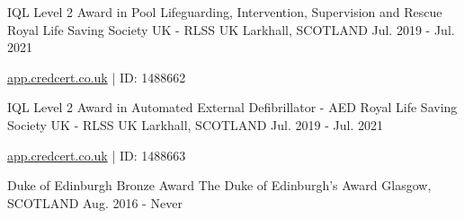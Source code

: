 

\begin{cventries}

  \cventry
    {IQL Level 2 Award in Pool Lifeguarding, Intervention, Supervision and Rescue} %
    {Royal Life Saving Society UK - RLSS UK} %
    {Larkhall, SCOTLAND} %
    {Jul. 2019 - Jul. 2021} %
    {
      \begin{cvitems} %
        \item \href{https://app.credcert.co.uk/3p/rlss/}{app.credcert.co.uk} | ID: 1488662
      \end{cvitems}
    }
    \vspace{.08cm}
    
  \cventry
    {IQL Level 2 Award in Automated External Defibrillator - AED} %
    {Royal Life Saving Society UK - RLSS UK} %
    {Larkhall, SCOTLAND} %
    {Jul. 2019 - Jul. 2021} %
    {
      \begin{cvitems} %
        \item \href{https://app.credcert.co.uk/3p/rlss/}{app.credcert.co.uk} | ID: 1488663
      \end{cvitems}
    }
    \vspace{.08cm}
    
  \cventry
    {Duke of Edinburgh Bronze Award} %
    {The Duke of Edinburgh's Award} %
    {Glasgow, SCOTLAND} %
    {Aug. 2016 - Never} %
    {}
    \vspace{-.35cm}
    
    

\end{cventries}
\vspace{-.3cm}